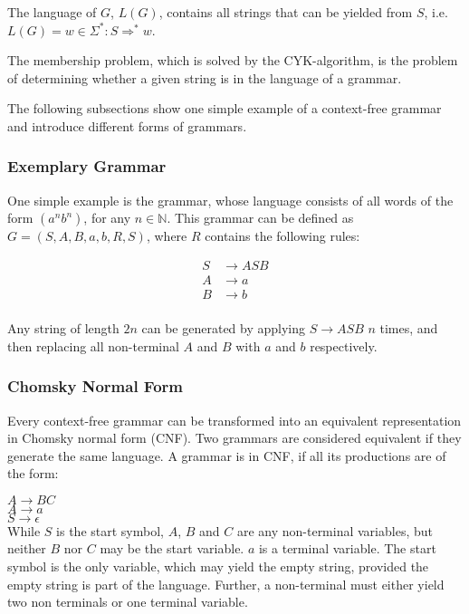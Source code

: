 The language of $G$, $L(G)$, contains all strings that can be yielded from $S$, i.e. $L(G)={w\in \Sigma^*: S\Rightarrow^{*}w}$.

The membership problem, which is solved by the CYK-algorithm, is the problem of determining whether a given string is in the language of a grammar.

The following subsections show one simple example of a context-free grammar and introduce different forms of grammars.

\subsubsection{Exemplary Grammar}
\label{subsec:exemplary_grammar}


One simple example is the grammar, whose language consists of all words of the form $(a^n b^n)$, for any $n\in \mathbb{N}$.
This grammar can be defined as $G = ({S, A, B}, {a, b}, R, S)$, where $R$ contains the following rules: 

\begin{align*}
S&\rightarrow ASB \\
A&\rightarrow a \\
B&\rightarrow b \\
\end{align*}

Any string of length $2n$ can be generated by applying $S\rightarrow ASB$ $n$ times, and then replacing all non-terminal $A$ and $B$ with $a$ and $b$ respectively.


\subsubsection{Chomsky Normal Form}

Every context-free grammar can be transformed into an equivalent representation in Chomsky normal form (CNF).
Two grammars are considered equivalent if they generate the same language.
A grammar is in CNF, if all its productions are of the form:

\hspace*{0.5cm}$A\rightarrow BC$\\
\hspace*{1cm}$A\rightarrow a$\\
\hspace*{1cm}$S\rightarrow \epsilon$\\

While $S$ is the start symbol, $A$, $B$ and $C$ are any non-terminal variables, but neither $B$ nor $C$ may be the start variable.
$a$ is a terminal variable.
The start symbol is the only variable, which may yield the empty string, provided the empty string is part of the language.
Further, a non-terminal must either yield two non terminals or one terminal variable.

